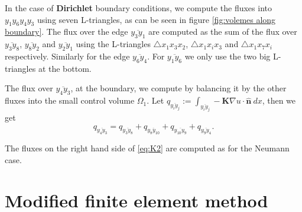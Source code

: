 \documentclass[../Main/main.tex]{subfiles}
\begin{document}
	\par
	In the case of \textbf{Dirichlet} boundary conditions, we compute the fluxes into $y_1 y_6 y_4 y_3$ using seven L-triangles, as can be seen in figure \ref{fig:volemes along boundary}. The flux over the edge $\overline{y_3 y_1}$ are computed as the sum of the flux over $\overline{y_3 y_8}$, $\overline{y_8 y_2}$ and $\overline{y_2 y_1}$ using the L-triangles $\triangle x_1 x_3 x_2$, $\triangle x_1 x_i x_3$ and $\triangle x_1 x_7 x_i$ respectively. Similarly for the edge $\overline{y_6 y_4}$. For $\overline{y_1 y_6}$ we only use the two big L-triangles at the bottom. 
	\par 
	The flux over $\overline{y_4 y_3}$, at the boundary, we compute by balancing it by the other fluxes into the small control volume $\Omega_1$. Let $	q_{\overline{y_i y_j}}:= \int_{\overline{y_i y_j}}  -\pmb{K}\nabla u \cdot \pmb{\hat{n}}\ dx $, then we get
	\begin{equation}\label{eq:K2}
		q_{\overline{y_4 y_3}} = q_{\overline{y_3 y_8}} + q_{\overline{y_8 y_{10}}}+q_{\overline{y_{10}y_9}}+q_{\overline{y_9 y_4}}.
	\end{equation}
	
	The fluxes on the right hand side of \eqref{eq:K2} are computed as for the Neumann case.
	\section*{Modified finite element method}
	
\end{document}
